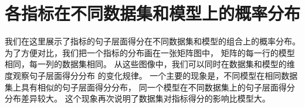 
\chapter{各指标在不同数据集和模型上的概率分布}
\label{ch:metric_dist}
我们在这里展示了指标的句子层面得分在不同数据集和模型的组合上的概率分布。
为了方便对比，我们把一个指标的分布画在一张矩阵图中，
矩阵的每一行的模型相同，每一列的数据集相同。
从这些图像中，我们可以同时在数据集和模型的维度观察句子层面得分分布
的变化规律。
一个主要的现象是，不同模型在相同数据集上具有相似的句子层面得分分布，
同一个模型在不同数据集上的句子层面得分分布差异较大。
这个现象再次说明了数据集对指标得分的影响比模型大。

























